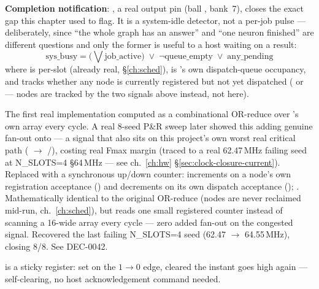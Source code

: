 \textbf{Completion notification}: , a real
output pin (ball , bank~7), closes the exact gap this
chapter used to flag. It is a system-idle detector, not a per-job
pulse --- deliberately, since ``the whole graph has an answer'' and
``one neuron finished'' are different questions and only the former is
useful to a host waiting on a result:
\[
\text{sys\_busy} = \big(\textstyle\bigvee \text{job\_active}\big)
\;\lor\; \lnot\text{queue\_empty} \;\lor\; \text{any\_pending}
\]
where  is per-slot (already real, \S\ref{ch:sched}),
 is 's own dispatch-queue
occupancy, and  tracks whether any node is
currently registered but not yet dispatched ( or
 ---  nodes are tracked by the two
signals above instead, not here).

\begin{fnwarn}
The first real implementation computed  as a
combinational OR-reduce over 's own
 array every cycle. A real 8-seed
 P\&R sweep later showed this adding genuine
fan-out onto  --- a signal that also sits on this
project's own worst real critical path
( $\to$
/), costing
real Fmax margin (traced to a real 62.47\,MHz failing seed at
N\_SLOTS=4 \S64\,MHz --- see ch.~\ref{ch:hw} \S\ref{sec:clock-closure-current}).
Replaced with a synchronous up/down
counter:  increments on a node's own registration
acceptance () and decrements on its own
dispatch acceptance (); . Mathematically identical to the original
OR-reduce (nodes are never reclaimed mid-run, ch.~\ref{ch:sched}), but
reads one small registered counter instead of scanning a 16-wide array
every cycle --- zero added fan-out on the congested signal. Recovered
the last failing N\_SLOTS=4 seed (62.47 $\to$ 64.55\,MHz), closing
8/8. See  DEC-0042.
\end{fnwarn}

 is a sticky
register: set on the  $1\to0$ edge, cleared the
instant  goes high again --- self-clearing, no host
acknowledgement command needed.

